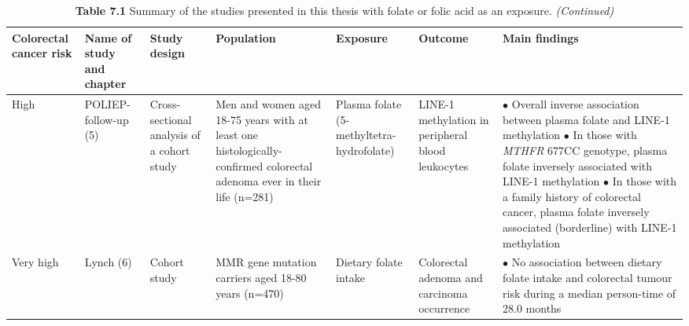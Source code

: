 \begin{sidewaystable}
\footnotesize
\caption*{\textbf{Table 7.1} {Summary of the studies presented in this thesis with folate or folic acid as an exposure.} \emph{(Continued)}}
\label{table7_1}
\begin{tabular}{L{1.3cm}C{1.5cm}C{2cm}C{2.1cm}C{2.1cm}C{2.1cm}C{4cm}}
\hline
\bfseries Colorectal cancer risk & \bfseries Name of study and chapter & \bfseries Study design & \bfseries Population & \bfseries Exposure & \bfseries Outcome & \bfseries Main findings\\
\hline
\parbox[t][5cm]{1.3cm}{High} &
\parbox[t][5cm]{1.5cm}{\centering POLIEP-follow-up (5)} &
\parbox[t][5cm]{2cm}{\centering Cross-sectional analysis of a cohort study} &
\parbox[t][5cm]{2.1cm}{\centering Men and women aged 18-75 years with at least one histologically-confirmed colorectal adenoma ever in their life (n=281)} &
\parbox[t][5cm]{2.1cm}{\centering Plasma folate (5-methyltetra-hydrofolate)} &
\parbox[t][5cm]{2.1cm}{\centering LINE-1 methylation in peripheral blood leukocytes} &
\parbox[t][5cm]{4cm}{\centering $\bullet$ Overall inverse association between plasma folate and LINE-1 methylation \\ $\bullet$ In those with \emph{MTHFR} 677CC genotype, plasma folate inversely associated with LINE-1 methylation \\ $\bullet$ In those with a family history of colorectal cancer, plasma folate inversely associated (borderline) with LINE-1 methylation}\\

\parbox[t][2.5cm]{1.3cm}{Very high} &
\parbox[t][2.5cm]{1.5cm}{\centering Lynch (6)} &
\parbox[t][2.5cm]{2cm}{\centering Cohort study} &
\parbox[t][2.5cm]{2.1cm}{\centering MMR gene mutation carriers aged 18-80 years (n=470)} &
\parbox[t][2.5cm]{2.1cm}{\centering Dietary folate intake} &
\parbox[t][2.5cm]{2.1cm}{\centering Colorectal adenoma and carcinoma occurrence} &
\parbox[t][2.5cm]{4cm}{ \centering $\bullet$ No association between dietary folate intake and colorectal tumour risk during a median person-time of 28.0 months}\\
\hline
\end{tabular}
\end{sidewaystable}


